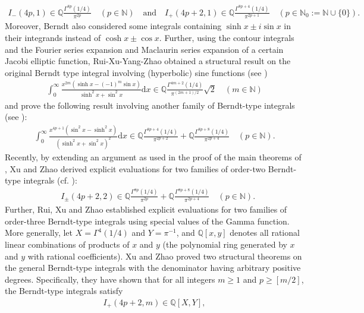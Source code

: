 \documentclass[11pt]{article}
\def\N{\mathbb{N}}
\def\Q{\mathbb{Q}}
\theoremstyle{plain}
\theoremstyle{definition}
\begin{document}
\begin{align*}
I_{-}(4p,1)\in \Q \frac{\Gamma^{8p}(1/4)}{\pi^{2p}}\quad (p\in \N)\quad\text{and}\quad I_{+}(4p+2,1)\in \Q \frac{\Gamma^{8p+4}(1/4)}{\pi^{2p+1}}\quad (p\in \N_0:=\N\cup\{0\}).
\end{align*}
Moreover, Berndt \cite[Thm. 6.1]{Berndt2016} also considered some integrals containing $\sinh x\pm i \sin x$ in their integrands instead of $\cosh x\pm \cos x$.
Further, using the contour integrals and the Fourier series expansion and Maclaurin series expansion of a certain Jacobi elliptic function, Rui-Xu-Yang-Zhao obtained a structural result on the original Berndt type integral involving (hyperbolic) sine functions (see \cite[Thm. 3.4]{RXYZ2024})
\begin{align}\label{equ-org-BerndtInte}
\int_0^\infty \frac{x^{2m} (\sinh x-(-1)^m \sin x)}{\sinh^2 x+\sin^2 x}\mathrm{d}x\in \Q \frac{\Gamma^{4m+2}(1/4)}{\pi^{(2m+1)/2}}\sqrt{2}\quad (m\in \N)
\end{align}
and prove the following result involving another family of Berndt-type integrals (see \cite[Cor. 6.5]{RXYZ2024}):
\begin{align} \label{defn:BerdtIntegral}
\int_{0}^{\infty}\frac{x^{4p+1}(\sin^2 x-\sinh^2 x)}{\left(\sinh^2 x+\sin^2 x\right)^2}\mathrm{d}x\in \Q\frac{\Gamma^{8p+4}(1/4)}{\pi^{2p+2}}+\Q\frac{\Gamma^{8p+8}(1/4)}{\pi^{2p+4}}\quad (p\in \N).
\end{align}
Recently, by extending an argument as used in the proof of the main theorems of \cite{Berndt2016}, Xu and Zhao \cite{XZ2023} derived explicit evaluations for two families of order-two Berndt-type integrals (cf. \cite[Thm. 1.3]{XZ2023}):
\begin{align*}
&I_{\pm}(4p+2,2)\in \Q\frac{\Gamma^{8p}(1/4)}{\pi^{2p}}+\Q\frac{\Gamma^{8p+8}(1/4)}{\pi^{2p+4}}\quad (p\in \N).
\end{align*}
Further, Rui, Xu and Zhao \cite[Thm. 1.1]{RXZ2023} established explicit evaluations for two families of order-three Berndt-type integrals using special values of the Gamma function.
More generally, let $X=\Gamma^4(1/4)$ and $Y=\pi^{-1}$, and $\Q[x, y]$ denotes all rational linear combinations of products of $x$ and $y$ (the
polynomial ring generated by $x$ and $y$ with rational coefficients). Xu and Zhao \cite{XZ2023,XZ2024} proved two structural theorems on the general Berndt-type integrals with the denominator having arbitrary positive degrees. Specifically, they have shown that for all integers $m\geq 1$ and $p\geq [m/2]$, the Berndt-type integrals satisfy
\begin{align*}
I_{+}(4p+2,m)\in\mathbb{Q}[X,Y],
\end{align*}
\end{document}
